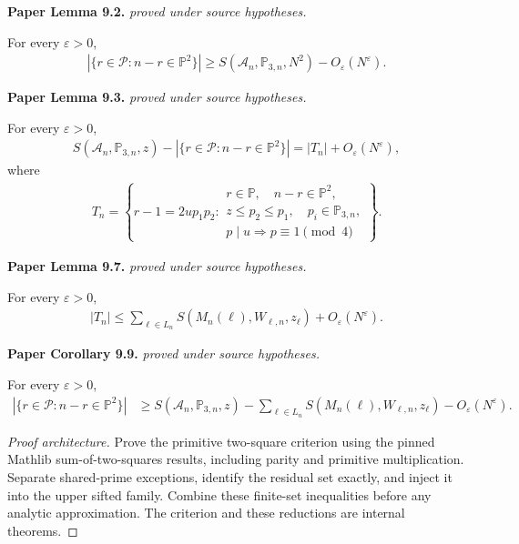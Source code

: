 \begin{lemma}
\label{goldbach_reductions}
\uses{}
\leanok
\par\medskip\noindent\textbf{Paper Lemma 9.2.} \textit{proved under source hypotheses.}\par
For every $\varepsilon>0$,
\begin{align}
 |\{r\in\mathcal P:n-r\in\mathbb P^2\}|
 \geq S(\mathcal A_n,\mathbb P_{3,n},N^2)-O_\varepsilon(N^\varepsilon).
\end{align}
\par\medskip\noindent\textbf{Paper Lemma 9.3.} \textit{proved under source hypotheses.}\par
For every \(\varepsilon>0\),
\begin{align}
 S(\mathcal A_n,\mathbb P_{3,n},z)
 -
 |\{r\in\mathcal P:n-r\in\mathbb P^2\}|
 =
 |T_n|+O_\varepsilon(N^\varepsilon),
\end{align}
where
\begin{align}
    T_n=
 \left\{
 r-1=2up_1p_2:
 \begin{array}{l}
 r\in\mathbb P,\quad n-r\in\mathbb P^2,\\
 z\leq p_2\leq p_1,\quad p_i\in\mathbb P_{3,n},\\
 p\mid u\Longrightarrow p\equiv1\pmod4
 \end{array}
 \right\}.
\end{align}
\par\medskip\noindent\textbf{Paper Lemma 9.7.} \textit{proved under source hypotheses.}\par
For every $\varepsilon>0$,
\begin{align}
 |T_n|
 \leq\sum_{\ell\in L_n}
 S(M_n(\ell),W_{\ell,n},z_\ell)+O_\varepsilon(N^\varepsilon).
\end{align}
\par\medskip\noindent\textbf{Paper Corollary 9.9.} \textit{proved under source hypotheses.}\par
For every $\varepsilon>0$,
\begin{align}
 |\{r\in\mathcal P:n-r\in\mathbb P^2\}|
 &\geq S(\mathcal A_n,\mathbb P_{3,n},z)-\sum_{\ell\in L_n}
 S(M_n(\ell),W_{\ell,n},z_\ell)
 -O_\varepsilon(N^\varepsilon).
\end{align}
\end{lemma}
\begin{proof}[Proof architecture]
\uses{}
\leanok
Prove the primitive two-square criterion using the pinned Mathlib sum-of-two-squares results, including parity and primitive multiplication. Separate shared-prime exceptions, identify the residual set exactly, and inject it into the upper sifted family. Combine these finite-set inequalities before any analytic approximation. The criterion and these reductions are internal theorems.
\end{proof}

